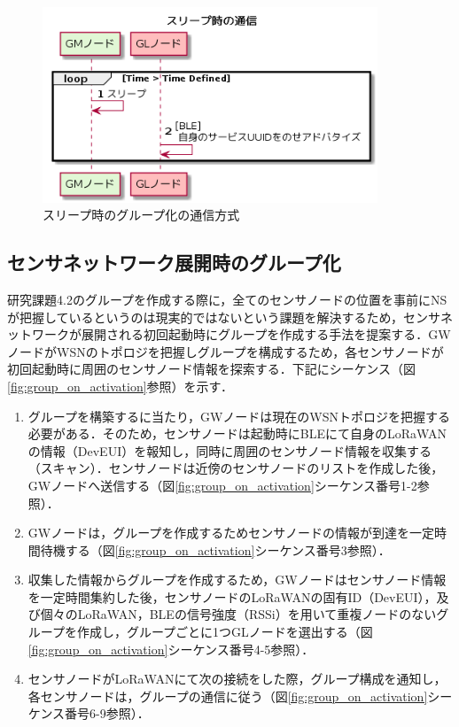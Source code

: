 \begin{figure}[]
    \begin{center}
    \includegraphics[width=10cm]{figures/v2.0/スリープ時の通信.png}
    \caption{スリープ時のグループ化の通信方式}
    \label{fig:group_sleep}
    \end{center}
\end{figure}

\subsection{センサネットワーク展開時のグループ化}
研究課題4.2のグループを作成する際に，全てのセンサノードの位置を事前にNSが把握しているというのは現実的ではないという課題を解決するため，センサネットワークが展開される初回起動時にグループを作成する手法を提案する．GWノードがWSNのトポロジを把握しグループを構成するため，各センサノードが初回起動時に周囲のセンサノード情報を探索する．下記にシーケンス（図\ref{fig:group_on_activation}参照）を示す．

\begin{enumerate}
    \item グループを構築するに当たり，GWノードは現在のWSNトポロジを把握する必要がある．そのため，センサノードは起動時にBLEにて自身のLoRaWANの情報（DevEUI）を報知し，同時に周囲のセンサノード情報を収集する（スキャン）．センサノードは近傍のセンサノードのリストを作成した後，GWノードへ送信する（図\ref{fig:group_on_activation}シーケンス番号1-2参照）．
    \item GWノードは，グループを作成するためセンサノードの情報が到達を一定時間待機する（図\ref{fig:group_on_activation}シーケンス番号3参照）．
    \item 収集した情報からグループを作成するため，GWノードはセンサノード情報を一定時間集約した後，センサノードのLoRaWANの固有ID（DevEUI），及び個々のLoRaWAN，BLEの信号強度（RSSi）を用いて重複ノードのないグループを作成し，グループごとに1つGLノードを選出する（図\ref{fig:group_on_activation}シーケンス番号4-5参照）．
    \item センサノードがLoRaWANにて次の接続をした際，グループ構成を通知し，各センサノードは，グループの通信に従う（図\ref{fig:group_on_activation}シーケンス番号6-9参照）．
\end{enumerate}


